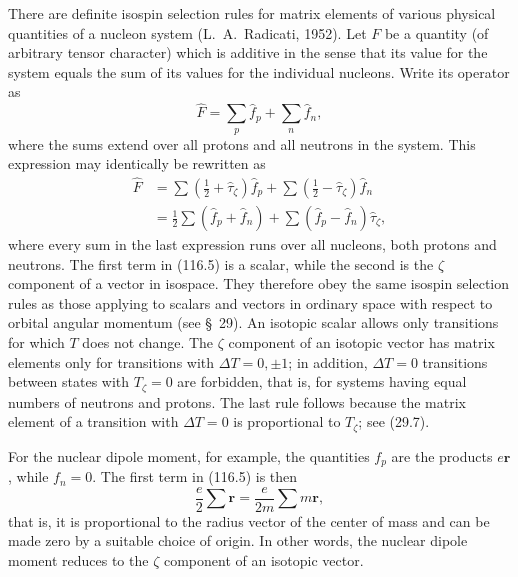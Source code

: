 There are definite isospin selection rules for matrix elements of various
physical quantities of a nucleon system (L.~A.~Radicati, 1952). Let $F$ be a
quantity (of arbitrary tensor character) which is additive in the sense that
its value for the system equals the sum of its values for the individual
nucleons. Write its operator as
\[
 \hat F=\sum_p\hat f_p+\sum_n\hat f_n,
\]
where the sums extend over all protons and all neutrons in the system. This
expression may identically be rewritten as
\begin{equation}
 \begin{split}
 \hat F&=\sum\left(\frac12+\hat\tau_\zeta\right)\hat f_p
 +\sum\left(\frac12-\hat\tau_\zeta\right)\hat f_n\\
 &=\frac12\sum(\hat f_p+\hat f_n)
 +\sum(\hat f_p-\hat f_n)\hat\tau_\zeta,
 \end{split}
 \tag{116.5}
\end{equation}
where every sum in the last expression runs over all nucleons, both protons
and neutrons. The first term in (116.5) is a scalar, while the second is the
$\zeta$ component of a vector in isospace. They therefore obey the same
isospin selection rules as those applying to scalars and vectors in ordinary
space with respect to orbital angular momentum (see \S~29). An isotopic scalar
allows only transitions for which $T$ does not change. The $\zeta$ component
of an isotopic vector has matrix elements only for transitions with
$\Delta T=0,\pm1$; in addition, $\Delta T=0$ transitions between states with
$T_\zeta=0$ are forbidden, that is, for systems having equal numbers of
neutrons and protons. The last rule follows because the matrix element of a
transition with $\Delta T=0$ is proportional to $T_\zeta$; see (29.7).

For the nuclear dipole moment, for example, the quantities $f_p$ are the
products $e\mathbf r$, while $f_n=0$. The first term in (116.5) is then
\[
 \frac e2\sum\mathbf r=\frac{e}{2m}\sum m\mathbf r,
\]
that is, it is proportional to the radius vector of the center of mass and can
be made zero by a suitable choice of origin. In other words, the nuclear
dipole moment reduces to the $\zeta$ component of an isotopic vector.
